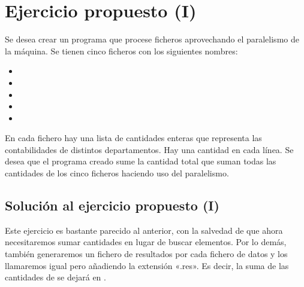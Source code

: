 \documentclass[letterpaper,10pt,spanish]{sphinxmanual}
\begin{document}
\begin{sphinxVerbatim}[commandchars=\\\{\}]
         
\end{sphinxVerbatim}


\section{Ejercicio propuesto (I)}
\label{\detokenize{textos/tema1:ejercicio-propuesto-i}}
Se desea crear un programa que procese ficheros aprovechando el paralelismo de la máquina. Se tienen cinco ficheros con los siguientes nombres:
\begin{itemize}
\item {} 

\item {} 

\item {} 

\item {} 

\item {} 

\end{itemize}

En cada fichero hay una lista de cantidades enteras que representa las contabilidades de distintos departamentos. Hay una cantidad en cada línea. Se desea que el programa creado sume la cantidad total que suman todas las cantidades de los cinco ficheros haciendo uso del paralelismo.


\subsection{Solución al ejercicio propuesto (I)}
\label{\detokenize{textos/tema1:solucion-al-ejercicio-propuesto-i}}
Este ejercicio es bastante parecido al anterior, con la salvedad de que ahora necesitaremos sumar cantidades en lugar de buscar elementos. Por lo demás,  también generaremos un fichero de resultados por cada fichero de datos y los llamaremos igual pero añadiendo la extensión «.res». Es decir, la suma de las cantidades de  se dejará en .
\end{document}
